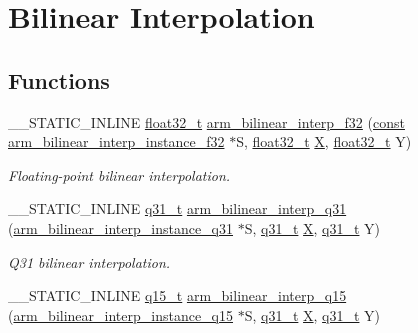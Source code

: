 \hypertarget{group___bilinear_interpolate}{\section{Bilinear Interpolation}
\label{group___bilinear_interpolate}
}
\subsection*{Functions}
\begin{DoxyCompactItemize}
\item 
\-\_\-\-\_\-\-S\-T\-A\-T\-I\-C\-\_\-\-I\-N\-L\-I\-N\-E \hyperlink{arm__math_8h_a4611b605e45ab401f02cab15c5e38715}{float32\-\_\-t} \hyperlink{group___bilinear_interpolate_gabfd6cfec7f05c5bb6af645b7d62f46d2}{arm\-\_\-bilinear\-\_\-interp\-\_\-f32} (\hyperlink{group___n_a_m_e_ga7ae6d0e43244213b34de2c2b9aa30da6}{const} \hyperlink{structarm__bilinear__interp__instance__f32}{arm\-\_\-bilinear\-\_\-interp\-\_\-instance\-\_\-f32} $\ast$S, \hyperlink{arm__math_8h_a4611b605e45ab401f02cab15c5e38715}{float32\-\_\-t} \hyperlink{group___i_n_s_g_p_s_ga878335db1805364cefebddb5eccfc282}{X}, \hyperlink{arm__math_8h_a4611b605e45ab401f02cab15c5e38715}{float32\-\_\-t} Y)
\begin{DoxyCompactList}\small\item\em Floating-\/point bilinear interpolation. \end{DoxyCompactList}\item 
\-\_\-\-\_\-\-S\-T\-A\-T\-I\-C\-\_\-\-I\-N\-L\-I\-N\-E \hyperlink{arm__math_8h_adc89a3547f5324b7b3b95adec3806bc0}{q31\-\_\-t} \hyperlink{group___bilinear_interpolate_gac96f580756af38d7a2e17e4baeec551d}{arm\-\_\-bilinear\-\_\-interp\-\_\-q31} (\hyperlink{structarm__bilinear__interp__instance__q31}{arm\-\_\-bilinear\-\_\-interp\-\_\-instance\-\_\-q31} $\ast$S, \hyperlink{arm__math_8h_adc89a3547f5324b7b3b95adec3806bc0}{q31\-\_\-t} \hyperlink{group___i_n_s_g_p_s_ga878335db1805364cefebddb5eccfc282}{X}, \hyperlink{arm__math_8h_adc89a3547f5324b7b3b95adec3806bc0}{q31\-\_\-t} Y)
\begin{DoxyCompactList}\small\item\em Q31 bilinear interpolation. \end{DoxyCompactList}\item 
\-\_\-\-\_\-\-S\-T\-A\-T\-I\-C\-\_\-\-I\-N\-L\-I\-N\-E \hyperlink{arm__math_8h_ab5a8fb21a5b3b983d5f54f31614052ea}{q15\-\_\-t} \hyperlink{group___bilinear_interpolate_ga8619980af3916bef36ba906bd6170da0}{arm\-\_\-bilinear\-\_\-interp\-\_\-q15} (\hyperlink{structarm__bilinear__interp__instance__q15}{arm\-\_\-bilinear\-\_\-interp\-\_\-instance\-\_\-q15} $\ast$S, \hyperlink{arm__math_8h_adc89a3547f5324b7b3b95adec3806bc0}{q31\-\_\-t} \hyperlink{group___i_n_s_g_p_s_ga878335db1805364cefebddb5eccfc282}{X}, \hyperlink{arm__math_8h_adc89a3547f5324b7b3b95adec3806bc0}{q31\-\_\-t} Y)

\end{DoxyCompactItemize}
